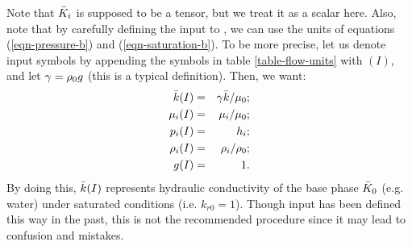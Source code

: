Note that ${\bar K}_i$ is supposed to be a tensor, but we treat it as
a scalar here.
Also, note that by carefully defining the input to \parflow{}, we can
use the units of equations (\ref{eqn-pressure-b}) and
(\ref{eqn-saturation-b}).
To be more precise, let us denote \parflow{} input symbols by appending
the symbols in table \ref{table-flow-units} with $(I)$, and
let $\gamma = \rho_0 g$ (this is a typical definition).
Then, we want:
\begin{eqnarray} \label{eqn-parflow-input}
{\bar k} (I)    & = & \gamma {\bar k} / \mu_0 ; \\
\mu_i (I) & = & \mu_i / \mu_0 ; \\
p_i (I)   & = & h_i ; \\
\rho_i (I) & = & \rho_i / \rho_0 ; \\
g (I)      & = & 1 .
\end{eqnarray}
By doing this, ${\bar k} (I)$ represents hydraulic conductivity of the base
phase ${\bar K}_0$ (e.g. water) under saturated conditions (i.e. $k_{r0} = 1$).
Though \parflow{} input has been defined this way in the past, this is not
the recommended procedure since it may lead to confusion and mistakes.
